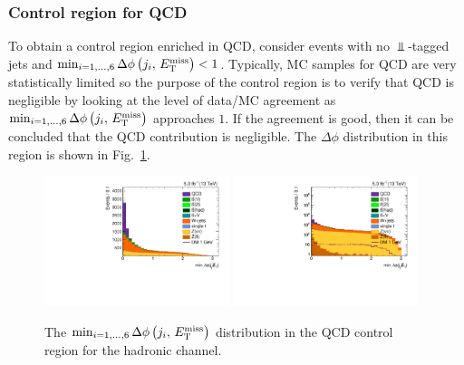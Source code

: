 \subsubsection{Control region for QCD}
\label{subsubsec:bkg_hadronic_qcd}

To obtain a control region enriched in QCD, consider events with no $\Bot$-tagged jets and $\min_{i=1,\ldots,6}\Delta\phi\left(j_i,\,E_\mathrm{T}^{\mathrm{miss}}\right)<1$. Typically, MC samples for QCD are very statistically limited so the purpose of the control region is to verify that QCD is negligible by looking at the level of data/MC agreement as $\min_{i=1,\ldots,6}\Delta\phi\left(j_i,\,E_\mathrm{T}^{\mathrm{miss}}\right)$ approaches $1$. If the agreement is good, then it can be concluded that the QCD contribution is negligible. The $\Delta\phi$ distribution in this region is shown in Fig.~\ref{fig:incl_hadronic_qcd_dphijetmet}.

\begin{figure}[htbp]
  \centering
  \includegraphics[width=0.48\textwidth]{figures/hadronic-incl-qcd-dphijetmet.pdf}
  \includegraphics[width=0.48\textwidth]{figures/hadronic-incl-qcd-dphijetmetlog.pdf}
  \caption{The $\min_{i=1,\ldots,6}\Delta\phi\left(j_i,\,E_\mathrm{T}^{\mathrm{miss}}\right)$ distribution in the QCD control region for the hadronic channel.}
  \label{fig:incl_hadronic_qcd_dphijetmet}
\end{figure}
